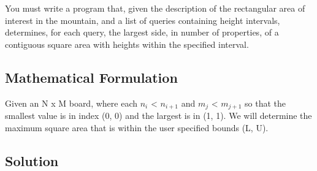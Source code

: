 \documentclass[12pt]{article}
\begin{document}
\begin{figure}[H]
    \centering
\end{figure}

\indent You must write a program that, given the description of the rectangular area of interest in the
mountain, and a list of queries containing height intervals, determines, for each query, the largest side,
in number of properties, of a contiguous square area with heights within the specified interval.


\newpage

\subsection{Mathematical Formulation}
Given an N x M board, where each $n_i$ < $n_{i+1}$ and $m_j$ < $m_{j+1}$ so that the smallest value is
in index (0, 0) and the largest is in (1, 1). We will determine the maximum square area that is within
the user specified bounds (L, U).


\subsection{Solution}
\end{document}
